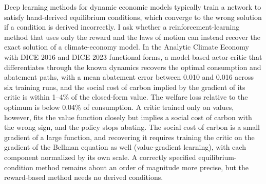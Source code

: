 Deep learning methods for dynamic economic models typically train a network to satisfy hand-derived equilibrium conditions, which converge to the wrong solution if a condition is derived incorrectly. I ask whether a reinforcement-learning method that uses only the reward and the laws of motion can instead recover the exact solution of a climate-economy model. In the Analytic Climate Economy with DICE 2016 and DICE 2023 functional forms, a model-based actor-critic that differentiates through the known dynamics recovers the optimal consumption and abatement paths, with a mean abatement error between 0.010 and 0.016 across six training runs, and the social cost of carbon implied by the gradient of its critic is within 1--4\% of the closed-form value. The welfare loss relative to the optimum is below 0.04\% of consumption. A critic trained only on values, however, fits the value function closely but implies a social cost of carbon with the wrong sign, and the policy stops abating. The social cost of carbon is a small gradient of a large function, and recovering it requires training the critic on the gradient of the Bellman equation as well (value-gradient learning), with each component normalized by its own scale. A correctly specified equilibrium-condition method remains about an order of magnitude more precise, but the reward-based method needs no derived conditions.
